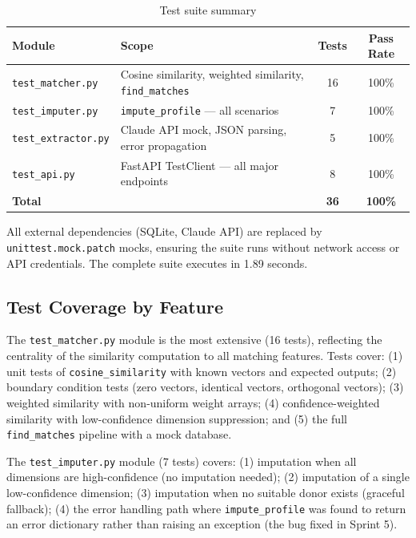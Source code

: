 \documentclass[11pt, a4paper]{report}
\begin{document}
\begin{table}[H]
  \centering
  \caption{Test suite summary}
  \label{tab:tests}
  \begin{tabular}{llcc}
    \toprule
    Module & Scope & Tests & Pass Rate \\
    \midrule
    \texttt{test\_matcher.py} & Cosine similarity, weighted similarity, \texttt{find\_matches} & 16 & 100\% \\
    \texttt{test\_imputer.py} & \texttt{impute\_profile} — all scenarios & 7 & 100\% \\
    \texttt{test\_extractor.py} & Claude API mock, JSON parsing, error propagation & 5 & 100\% \\
    \texttt{test\_api.py} & FastAPI TestClient — all major endpoints & 8 & 100\% \\
    \midrule
    \textbf{Total} & & \textbf{36} & \textbf{100\%} \\
    \bottomrule
  \end{tabular}
\end{table}

All external dependencies (SQLite, Claude API) are replaced by \texttt{unittest.mock.patch} mocks, ensuring the suite runs without network access or API credentials. The complete suite executes in 1.89 seconds.

\subsection{Test Coverage by Feature}

The \texttt{test\_matcher.py} module is the most extensive (16 tests), reflecting the centrality of the similarity computation to all matching features. Tests cover: (1) unit tests of \texttt{cosine\_similarity} with known vectors and expected outputs; (2) boundary condition tests (zero vectors, identical vectors, orthogonal vectors); (3) weighted similarity with non-uniform weight arrays; (4) confidence-weighted similarity with low-confidence dimension suppression; and (5) the full \texttt{find\_matches} pipeline with a mock database.

The \texttt{test\_imputer.py} module (7 tests) covers: (1) imputation when all dimensions are high-confidence (no imputation needed); (2) imputation of a single low-confidence dimension; (3) imputation when no suitable donor exists (graceful fallback); (4) the error handling path where \texttt{impute\_profile} was found to return an error dictionary rather than raising an exception (the bug fixed in Sprint 5).
\end{document}
